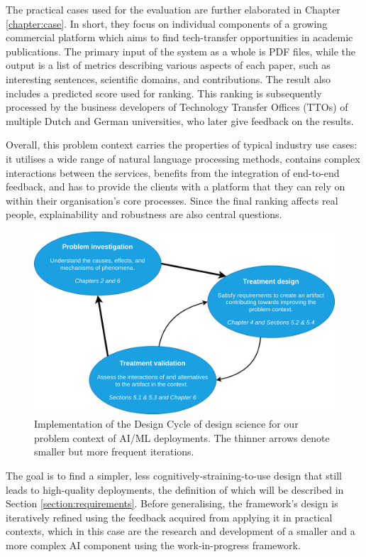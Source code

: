 The practical cases used for the evaluation are further elaborated in Chapter \ref{chapter:case}. In short, they focus on individual components of a growing commercial platform which aims to find tech-transfer opportunities in academic publications. The primary input of the system as a whole is PDF files, while the output is a list of metrics describing various aspects of each paper, such as interesting sentences, scientific domains, and contributions. The result also includes a predicted score used for ranking. This ranking is subsequently processed by the business developers of Technology Transfer Offices (TTOs) of multiple Dutch and German universities, who later give feedback on the results.

Overall, this problem context carries the properties of typical industry use cases: it utilises a wide range of natural language processing methods, contains complex interactions between the services, benefits from the integration of end-to-end feedback, and has to provide the clients with a platform that they can rely on within their organisation's core processes. Since the final ranking affects real people, explainability and robustness are also central questions.

\begin{figure}
    \centering
    \includegraphics[width=.75\linewidth]{figures/design-cycle.drawio.png}
    \captionsetup{width=.9\linewidth}
    \caption{Implementation of the Design Cycle of design science \cite{wieringa2014design} for our problem context of AI/ML deployments. The thinner arrows denote smaller but more frequent iterations.}
    \label{fig:design-cycle}
\end{figure}

The goal is to find a simpler, less cognitively-straining-to-use design that still leads to high-quality deployments, the definition of which will be described in Section \ref{section:requirements}. Before generalising, the framework's design is iteratively refined using the feedback acquired from applying it in practical contexts, which in this case are the research and development of a smaller and a more complex AI component using the work-in-progress framework. 


